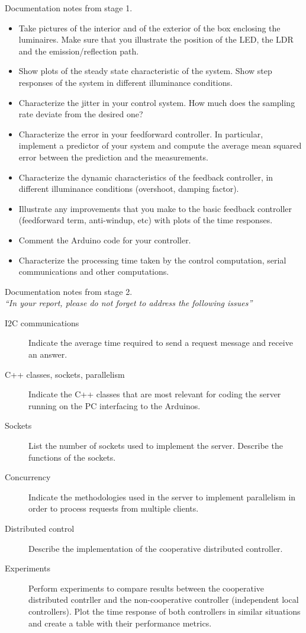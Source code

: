 \documentclass[english,fira]{ist-report}
\begin{document}
Documentation notes from stage 1.
\begin{itemize}
	\item Take pictures of the interior and of the exterior of the box enclosing the luminaires. Make sure that you illustrate the position of the LED, the LDR and the emission/reflection path.
	\item Show plots of the steady state characteristic of the system. Show step responses of the system in different illuminance conditions.
	\item Characterize the jitter in your control system. How much does the sampling rate deviate from the desired one?
	\item Characterize the error in your feedforward controller. In particular, implement a predictor of your system and compute the average mean squared error between the prediction and the measurements.
	\item Characterize the dynamic characteristics of the feedback controller, in different illuminance conditions (overshoot, damping factor).
	\item Illustrate any improvements that you make to the basic feedback controller (feedforward term, anti-windup, etc) with plots of the time responses.
	\item Comment the Arduino code for your controller.
	\item Characterize the processing time taken by the control computation, serial communications and other computations.
\end{itemize}

Documentation notes from stage 2. \\
\textit{``In your report, please do not forget to address the following issues''}
\begin{description}
	\item[I2C communications] Indicate the average time required to send a request message and receive an answer.
	\item[C++ classes, sockets, parallelism] Indicate the C++ classes that are most relevant for coding the server running on the PC interfacing to the Arduinos.
	\item[Sockets] List the number of sockets used to implement the server. Describe the functions of the sockets.
	\item[Concurrency] Indicate the methodologies used in the server to implement parallelism in order to process requests from multiple clients.
	\item[Distributed control] Describe the implementation of the cooperative distributed controller.
	\item[Experiments] Perform experiments to compare results between the cooperative distributed contrller and the non-cooperative controller (independent local controllers). Plot the time response of both controllers in similar situations and create a table with their performance metrics.
\end{description}
\end{document}
